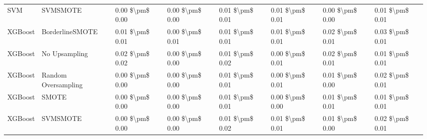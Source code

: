\begin{tabular}{llllllll}
                            SVM &                      SVMSMOTE & 0.00 \$\textbackslash pm\$ 0.00 &           0.00 \$\textbackslash pm\$ 0.00 &       0.01 \$\textbackslash pm\$ 0.01 &        0.01 \$\textbackslash pm\$ 0.01 &                         0.00 \$\textbackslash pm\$ 0.00 &     0.01 \$\textbackslash pm\$ 0.01 \\
                        XGBoost &               BorderlineSMOTE & 0.01 \$\textbackslash pm\$ 0.01 &           0.00 \$\textbackslash pm\$ 0.01 &       0.01 \$\textbackslash pm\$ 0.01 &        0.01 \$\textbackslash pm\$ 0.01 &                         0.02 \$\textbackslash pm\$ 0.01 &     0.03 \$\textbackslash pm\$ 0.01 \\
                        XGBoost &                 No Upsampling & 0.02 \$\textbackslash pm\$ 0.02 &           0.00 \$\textbackslash pm\$ 0.00 &       0.01 \$\textbackslash pm\$ 0.02 &        0.00 \$\textbackslash pm\$ 0.01 &                         0.02 \$\textbackslash pm\$ 0.01 &     0.01 \$\textbackslash pm\$ 0.01 \\
                        XGBoost &           Random Oversampling & 0.00 \$\textbackslash pm\$ 0.00 &           0.00 \$\textbackslash pm\$ 0.00 &       0.01 \$\textbackslash pm\$ 0.01 &        0.00 \$\textbackslash pm\$ 0.01 &                         0.01 \$\textbackslash pm\$ 0.00 &     0.02 \$\textbackslash pm\$ 0.01 \\
                        XGBoost &                         SMOTE & 0.00 \$\textbackslash pm\$ 0.00 &           0.00 \$\textbackslash pm\$ 0.00 &       0.01 \$\textbackslash pm\$ 0.01 &        0.00 \$\textbackslash pm\$ 0.00 &                         0.01 \$\textbackslash pm\$ 0.01 &     0.01 \$\textbackslash pm\$ 0.01 \\
                        XGBoost &                      SVMSMOTE & 0.00 \$\textbackslash pm\$ 0.00 &           0.00 \$\textbackslash pm\$ 0.00 &       0.01 \$\textbackslash pm\$ 0.02 &        0.01 \$\textbackslash pm\$ 0.01 &                         0.01 \$\textbackslash pm\$ 0.00 &     0.02 \$\textbackslash pm\$ 0.01 \\
\bottomrule
\end{tabular}
